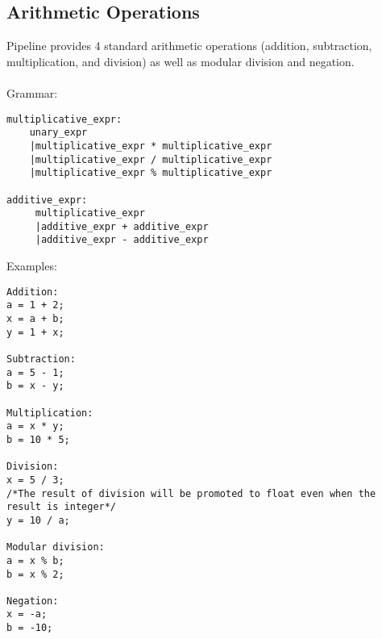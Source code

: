 \documentclass[./LRM_main.tex]{subfiles}
\begin{document}
\subsection{Arithmetic Operations}
Pipeline provides 4 standard arithmetic operations (addition, subtraction, multiplication, and division) as well as modular division and negation.\\
\vspace{1 mm}\\
Grammar:
\begin{lstlisting}
multiplicative_expr:
    unary_expr
    |multiplicative_expr * multiplicative_expr
    |multiplicative_expr / multiplicative_expr
    |multiplicative_expr % multiplicative_expr

additive_expr:
     multiplicative_expr
     |additive_expr + additive_expr
     |additive_expr - additive_expr

\end{lstlisting}
\pagebreak
Examples:
\begin{lstlisting}
Addition:
a = 1 + 2;
x = a + b;
y = 1 + x;

Subtraction:
a = 5 - 1;
b = x - y;

Multiplication:
a = x * y;
b = 10 * 5;

Division:
x = 5 / 3; 
/*The result of division will be promoted to float even when the result is integer*/
y = 10 / a;

Modular division:
a = x % b;
b = x % 2;

Negation:
x = -a;
b = -10;
\end{lstlisting}
\end{document}
